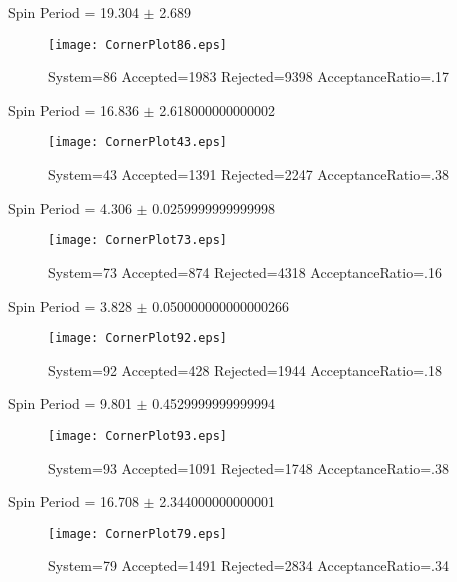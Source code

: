 \documentclass[10pt]{article}
\begin{document}
\newpage
\begin{center}
        Spin Period = 19.304 $\pm$ 2.689
        \end{center}
\begin{figure}[H] 
        \texttt{[image: CornerPlot86.eps]}
        \caption{System=86 Accepted=1983 Rejected=9398 AcceptanceRatio=.17}
        \label{S86}
        \centering
        \end{figure}
\newpage
\begin{center}
        Spin Period = 16.836 $\pm$ 2.618000000000002
        \end{center}
\begin{figure}[H] 
        \texttt{[image: CornerPlot43.eps]}
        \caption{System=43 Accepted=1391 Rejected=2247 AcceptanceRatio=.38}
        \label{S43}
        \centering
        \end{figure}
\newpage
\begin{center}
        Spin Period = 4.306 $\pm$ 0.0259999999999998
        \end{center}
\begin{figure}[H] 
        \texttt{[image: CornerPlot73.eps]}
        \caption{System=73 Accepted=874 Rejected=4318 AcceptanceRatio=.16}
        \label{S73}
        \centering
        \end{figure}
\newpage
\begin{center}
        Spin Period = 3.828 $\pm$ 0.050000000000000266
        \end{center}
\begin{figure}[H] 
        \texttt{[image: CornerPlot92.eps]}
        \caption{System=92 Accepted=428 Rejected=1944 AcceptanceRatio=.18}
        \label{S92}
        \centering
        \end{figure}
\newpage
\begin{center}
        Spin Period = 9.801 $\pm$ 0.4529999999999994
        \end{center}
\begin{figure}[H] 
        \texttt{[image: CornerPlot93.eps]}
        \caption{System=93 Accepted=1091 Rejected=1748 AcceptanceRatio=.38}
        \label{S93}
        \centering
        \end{figure}
\newpage
\begin{center}
        Spin Period = 16.708 $\pm$ 2.344000000000001
        \end{center}
\begin{figure}[H] 
        \texttt{[image: CornerPlot79.eps]}
        \caption{System=79 Accepted=1491 Rejected=2834 AcceptanceRatio=.34}
        \label{S79}
        \centering
        \end{figure}
\end{document}
